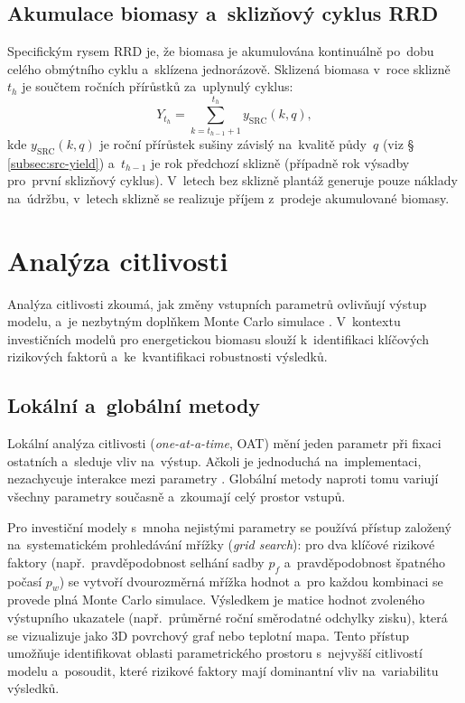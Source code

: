 \subsection{Akumulace biomasy a~sklizňový cyklus RRD}
\label{subsec:akumulace-sklizen}

Specifickým rysem RRD je, že biomasa je akumulována kontinuálně po~dobu
celého obmýtního cyklu a~sklízena jednorázově. Sklizená biomasa
v~roce sklizně~$t_h$ je součtem ročních přírůstků za~uplynulý cyklus:
\begin{equation}
    Y_{t_h} = \sum_{k=t_{h-1}+1}^{t_h} y_{\mathrm{SRC}}(k, q),
    \label{eq:src-harvest}
\end{equation}
kde $y_{\mathrm{SRC}}(k, q)$ je roční přírůstek sušiny závislý
na~kvalitě půdy~$q$ (viz § \ref{subsec:src-yield}) a~$t_{h-1}$ je rok
předchozí sklizně (případně rok výsadby pro~první sklizňový cyklus).
V~letech bez sklizně plantáž generuje pouze náklady na~údržbu,
v~letech sklizně se realizuje příjem z~prodeje akumulované biomasy.


\section{Analýza citlivosti
}
Analýza citlivosti zkoumá, jak změny vstupních parametrů ovlivňují výstup modelu, a~je nezbytným doplňkem Monte Carlo simulace \cite{Saltelli2008}. V~kontextu investičních modelů pro energetickou biomasu slouží k~identifikaci klíčových rizikových faktorů a~ke~kvantifikaci robustnosti výsledků.

\subsection{Lokální a~globální metody}
\label{subsec:citlivost-metody}

Lokální analýza citlivosti (\textit{one-at-a-time}, OAT) mění jeden parametr při fixaci ostatních a~sleduje vliv na~výstup. Ačkoli je jednoduchá na~implementaci, nezachycuje interakce mezi parametry \cite{Saltelli2008}. Globální metody naproti tomu variují všechny parametry současně a~zkoumají celý prostor vstupů.

Pro investiční modely s~mnoha nejistými parametry se používá přístup založený na~systematickém prohledávání mřížky (\textit{grid search}): pro dva klíčové rizikové faktory (např.~pravděpodobnost selhání sadby $p_f$ a~pravděpodobnost špatného počasí $p_w$) se vytvoří dvourozměrná mřížka hodnot a~pro každou kombinaci se provede plná Monte Carlo simulace. Výsledkem je matice hodnot zvoleného výstupního ukazatele (např.~průměrné roční směrodatné odchylky zisku), která se vizualizuje jako 3D povrchový graf nebo teplotní mapa. Tento přístup umožňuje identifikovat oblasti parametrického prostoru s~nejvyšší citlivostí modelu a~posoudit, které rizikové faktory mají dominantní vliv na~variabilitu výsledků.





